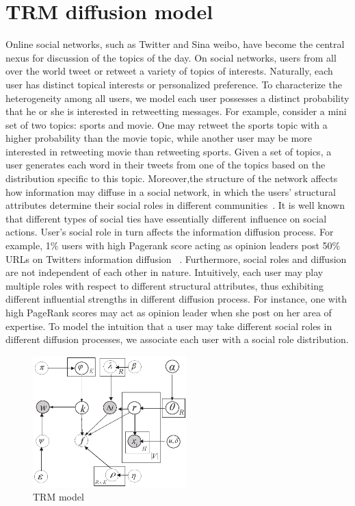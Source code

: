 \documentclass[runningheads,a4paper]{llncs}
\begin{document}
\section{TRM diffusion model}
Online social networks, such as Twitter and Sina weibo, have become the central nexus for discussion of the topics of the day. On social networks, users from all over the world tweet or retweet a variety of topics of interests. Naturally, each user has distinct topical interests or personalized preference. To characterize the heterogeneity among all users, we model each user possesses a distinct probability that he or she is interested in retweetting messages. For example, consider a mini set of two topics: sports and movie. One may retweet the sports topic with a higher probability than the movie topic, while another user may be more interested in retweeting movie than retweeting sports. Given a set of topics, a user generates each word in their tweets from one of the topics based on the distribution specific to this topic. Moreover,the structure of the network affects how information may diffuse in a social network, in which the users' structural attributes determine their social roles in different communities~\cite{Wasserman1994Social}. It is well known that different types of social ties have essentially different influence on social actions. User's social role in turn affects the information diffusion process. For example, 1\% users with high Pagerank score \cite{page1999pagerank} acting as opinion leaders post 50\% URLs on Twitters information diffusion ~\cite{wu2011says}. Furthermore, social roles and diffusion are not independent of each other in nature. Intuitively, each user may play multiple roles with respect to different structural attributes, thus exhibiting different influential strengths in different diffusion process. For instance, one with high PageRank scores may act as opinion leader when she post on her area of expertise. To model the intuition that a user may take different social roles in different diffusion processes, we associate each user with a social role distribution.
  \begin{figure}[h]
\centering
\includegraphics[height=2.0in, width=2.5 in]{newmodel}
\caption{TRM model}
\label{fig:model}
\end{figure}
\end{document}
